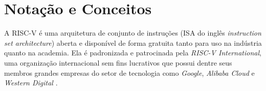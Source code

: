 
\chapter{Notação e Conceitos}
\label{cap:notecon}

A RISC-V é uma arquitetura de conjunto de instruções (ISA do inglês 
\emph{instruction set architecture}) aberta e disponível de forma gratuita 
tanto para uso na indústria quanto na academia. 
Ela é padronizada e patrocinada pela \emph{RISC-V International}, uma organização 
internacional sem fins lucrativos que possui dentre seus membros grandes 
empresas do setor de tecnologia como \emph{Google}, \emph{Alibaba Cloud} e 
\emph{Western Digital} \citep{MEM}.
